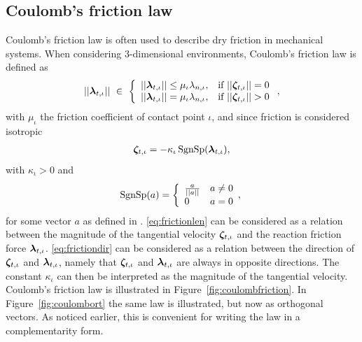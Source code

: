 \documentclass[../DC2017114Bouma.tex]{subfiles}
\begin{document}
\subsection{Coulomb's friction law}
Coulomb's friction law is often used to describe dry friction in mechanical systems. When considering 3-dimensional environments, Coulomb's friction law is defined as 
\begin{align}
||\lambdab_{t,\iota}||\ \in\ \left\{ \begin{array}{ll}
||\lambdab_{t,\iota}||\leq\mu_{\iota}\lambda_{n,\iota}, &\text{if }||\zetab_{t,\iota}||=0\\
||\lambdab_{t,\iota}|| = \mu_{\iota}\lambda_{n,\iota}, &\text{if }||\zetab_{t,\iota}||>0
\end{array}\right.,\label{eq:frictionlen}
\end{align}
%
with $\mu_{\iota}$ the friction coefficient of contact point $\iota$, and since friction is considered isotropic
\begin{align}
\boldsymbol{\zeta}_{t,\iota} = -\kappa_{\iota}\operatorname{\text{SgnSp}}(\boldsymbol{\lambda}_{t,\iota}),\label{eq:frictiondir}
\end{align}
with $\kappa_{\iota}>0$ and
\begin{equation}
\operatorname{\text{SgnSp}}(a) = \left\lbrace\begin{array}{ll}
\frac{a}{||a||} & a \neq 0\\
0 & a = 0
\end{array},\right.
\end{equation}
for some vector $a$ as defined in \cite{Studer2006}. \eqref{eq:frictionlen} can be considered as a relation between the magnitude of the tangential velocity $\boldsymbol{\zeta}_{t,\iota}$ and the reaction friction force $\boldsymbol{\lambda}_{t,\iota}$. \eqref{eq:frictiondir} can be considered as a relation between the direction of $\boldsymbol{\zeta}_{t,\iota}$ and $\boldsymbol{\lambda}_{t,\iota}$, namely that $\boldsymbol{\zeta}_{t,\iota}$ and $\boldsymbol{\lambda}_{t,\iota}$ are always in opposite directions. The constant $\kappa_{\iota}$ can then be interpreted as the magnitude of the tangential velocity. Coulomb's friction law is illustrated in Figure~\ref{fig:coulombfriction}. In Figure~\ref{fig:coulombort} the same law is illustrated, but now as orthogonal vectors. As noticed earlier, this is convenient for writing the law in a complementarity form.
\end{document}
